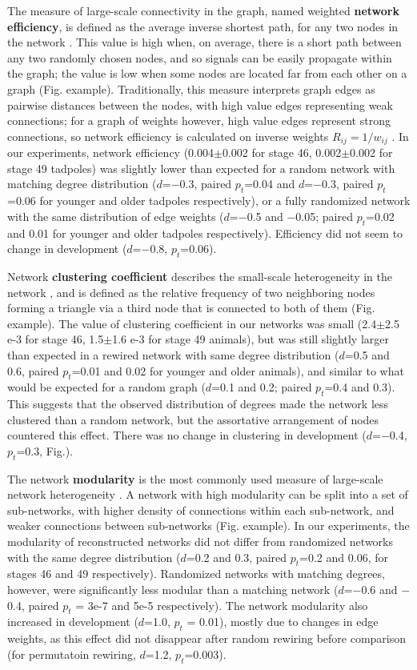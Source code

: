 \documentclass{article}
\begin{document}
The measure of large-scale connectivity in the graph, named weighted \textbf{network efficiency}, is defined as the average inverse shortest path, for any two nodes in the network \citep{rubinov2010toolbox,latora2001efficiency}. This value is high when, on average, there is a short path between any two randomly chosen nodes, and so signals can be easily propagate within the graph; the value is low when some nodes are located far from each other on a graph (Fig. example). Traditionally, this measure interprets graph edges as pairwise distances between the nodes, with high value edges representing weak connections; for a graph of weights however, high value edges represent strong connections, so network efficiency is calculated on inverse weights $R_{ij} = 1/w_{ij}$ \citep{rubinov2010toolbox}. In our experiments, network efficiency (0.004$\pm$0.002 for stage 46, 0.002$\pm$0.002 for stage 49 tadpoles) was slightly lower than expected for a random network with matching degree distribution ($d$=$-$0.3, paired $p_t$=0.04 and $d$=$-$0.3, paired $p_t$=0.06 for younger and older tadpoles respectively), or a fully randomized network with the same distribution of edge weights ($d$=$-$0.5 and $-$0.05; paired $p_t$=0.02 and 0.01 for younger and older tadpoles respectively). Efficiency did not seem to change in development ($d$=$-$0.8, $p_t$=0.06).

Network \textbf{clustering coefficient} describes the small-scale heterogeneity in the network \citep{fagiolo2007}, and is defined as the relative frequency of two neighboring nodes forming a triangle via a third node that is connected to both of them (Fig. example). The value of clustering coefficient in our networks was small (2.4$\pm$2.5 e-3 for stage 46, 1.5$\pm$1.6 e-3 for stage 49 animals), but was still slightly larger than expected in a rewired network with same degree distribution ($d$=0.5 and 0.6, paired $p_t$=0.01 and 0.02 for younger and older animals), and similar to what would be expected for a random graph ($d$=0.1 and 0.2; paired $p_t$=0.4 and 0.3). This suggests that the observed distribution of degrees made the network less clustered than a random network, but the assortative arrangement of nodes countered this effect. There was no change in clustering in development ($d$=$-$0.4, $p_t$=0.3, Fig.).

The network \textbf{modularity} is the most commonly used measure of large-scale network heterogeneity \citep{leicht2008community,newman2006modularity}. A network with high modularity can be split into a set of sub-networks, with higher density of connections within each sub-network, and weaker connections between sub-networks (Fig. example). In our experiments, the modularity of reconstructed networks did not differ from randomized networks with the same degree distribution ($d$=0.2 and 0.3, paired $p_t$=0.2 and 0.06, for stages 46 and 49 respectively). Randomized networks with matching degrees, however, were significantly less modular than a matching network ($d$=$-$0.6 and $-$0.4, paired $p_t$ = 3e-7 and 5e-5 respectively). The network modularity also increased in development ($d$=1.0, $p_t$ = 0.01), mostly due to changes in edge weights, as this effect did not disappear after random rewiring before comparison (for permutatoin rewiring, $d$=1.2, $p_t$=0.003).
\end{document}
